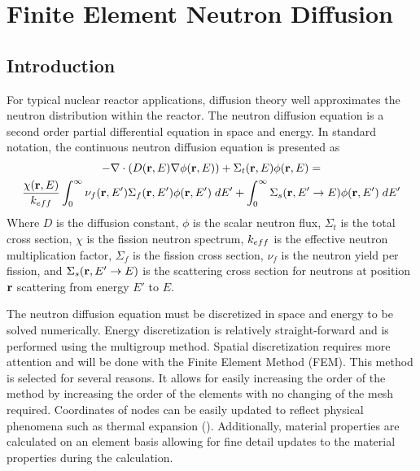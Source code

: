 \chapter{Finite Element Neutron Diffusion}
\label{ch:neutronDiffusion}

\section{Introduction}
  For typical nuclear reactor applications, diffusion theory well approximates 
  the neutron distribution within the reactor. The neutron diffusion equation is
  a second order partial differential equation in space and energy. In standard
  notation, the continuous neutron diffusion equation is presented as
  \begin{multline}\label{eq:continuous_diffusion}
    -\mathbf{\nabla} \cdot (D(\mathbf{r},E) \mathbf{\nabla} \phi(\mathbf{r},E)) + \Sigma_t(\mathbf{r},E) \phi(\mathbf{r},E) = \\
      \frac{\chi(\mathbf{r},E)}{k_{eff}} \int_0^{\infty} \nu_f(\mathbf{r},E') \Sigma_f(\mathbf{r},E') 
      \phi(\mathbf{r},E') \; dE' + \int_0^{\infty} \Sigma_s(\mathbf{r},E' \rightarrow E) 
      \phi(\mathbf{r},E') \; dE'
  \end{multline}
  Where $D$ is the diffusion constant, $\phi$ is the scalar neutron flux, 
  $\Sigma_t$ is the total cross section, $\chi$ is the fission neutron 
  spectrum, $k_{eff}$ is the effective neutron multiplication factor, $\Sigma_f$ 
  is the fission cross section, $\nu_f$ is the neutron yield per fission, and 
  $\Sigma_s(\mathbf{r},E' \rightarrow E)$ is the scattering cross section for neutrons 
  at position $\mathbf{r}$ scattering from energy $E'$ to $E$.
  
  The neutron diffusion equation must be discretized in space and 
  energy to be solved numerically. Energy discretization is relatively 
  straight-forward and is performed using the multigroup method. Spatial 
  discretization requires more attention and will be done with the Finite 
  Element Method (FEM). This method is selected for several reasons. It allows
  for easily increasing the order of the method by increasing the order of the 
  elements with no changing of the mesh required. Coordinates of nodes can be 
  easily updated to reflect physical phenomena such as thermal expansion 
  (). Additionally, material properties are 
  calculated on an element basis allowing for fine detail updates to the 
  material properties during the calculation.
  
